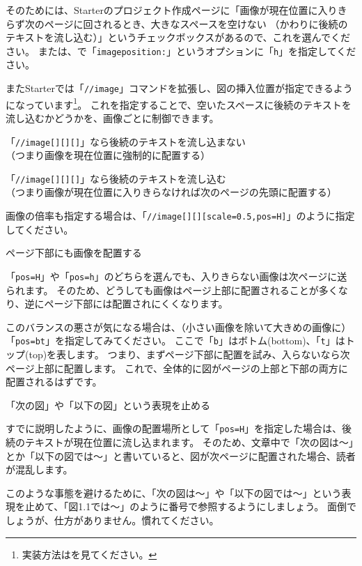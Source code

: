 そのためには、Starterのプロジェクト作成ページに「画像が現在位置に入りきらず次のページに回されるとき、大きなスペースを空けない （かわりに後続のテキストを流し込む）」というチェックボックスがあるので、これを選んでください。
または、で「\texttt{image\textunderscore{}position:}」というオプションに「\texttt{h}」を指定してください。

またStarterでは「\texttt{//image}」コマンドを拡張し、図の挿入位置が指定できるようになっています\footnote{実装方法はを見てください。}。
これを指定することで、空いたスペースに後続のテキストを流し込むかどうかを、画像ごとに制御できます。

\begin{starteritemize}
\item 「\texttt{//image[][][}\texttt{]}」なら後続のテキストを流し込まない\\{}
   （つまり画像を現在位置に強制的に配置する）
\item 「\texttt{//image[][][}\texttt{]}」なら後続のテキストを流し込む\\{}
   （つまり画像が現在位置に入りきらなければ次のページの先頭に配置する）
\end{starteritemize}

画像の倍率も指定する場合は、「\texttt{//image[][][scale=0.5,pos=H]}」のように指定してください。

\begin{starternote}{ページ下部にも画像を配置する}
\begin{starternoteinner}

「\texttt{pos=H}」や「\texttt{pos=h}」のどちらを選んでも、入りきらない画像は次ページに送られます。
そのため、どうしても画像はページ上部に配置されることが多くなり、逆にページ下部には配置されにくくなります。

このバランスの悪さが気になる場合は、（小さい画像を除いて大きめの画像に）「\texttt{pos=bt}」を指定してみてください。
ここで「\texttt{b}」はボトム(bottom)、「\texttt{t}」はトップ(top)を表します。
つまり、まずページ下部に配置を試み、入らないなら次ページ上部に配置します。
これで、全体的に図がページの上部と下部の両方に配置されるはずです。

\end{starternoteinner}
\end{starternote}
\begin{starternote}{「次の図」や「以下の図」という表現を止める}
\begin{starternoteinner}

すでに説明したように、画像の配置場所として「\texttt{pos=H}」を指定した場合は、後続のテキストが現在位置に流し込まれます。
そのため、文章中で「次の図は〜」とか「以下の図では〜」と書いていると、図が次ページに配置された場合、読者が混乱します。

このような事態を避けるために、「次の図は〜」や「以下の図では〜」という表現を止めて、「図1.1では〜」のように番号で参照するようにしましょう。
面倒でしょうが、仕方がありません。慣れてください。

\end{starternoteinner}
\end{starternote}

